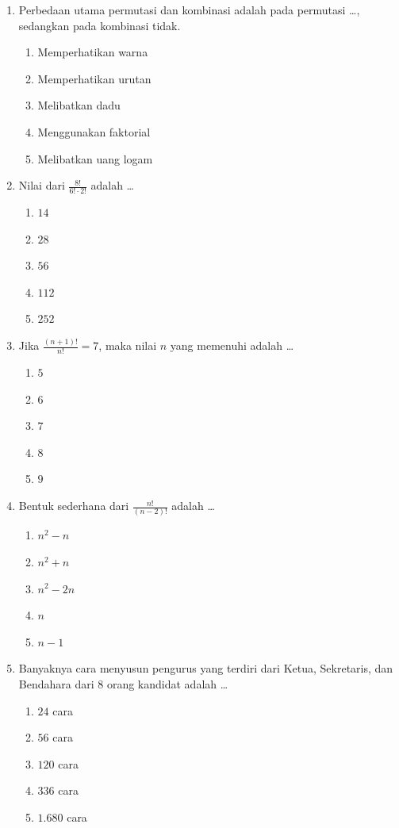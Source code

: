 \documentclass[12pt,a4paper]{article}
\begin{document}
\begin{enumerate}[leftmargin=*]
\item Perbedaan utama permutasi dan kombinasi adalah pada permutasi \dots, sedangkan pada kombinasi tidak.
    \begin{enumerate}[label=\alph*.]
        \item Memperhatikan warna
        \item Memperhatikan urutan
        \item Melibatkan dadu
        \item Menggunakan faktorial
        \item Melibatkan uang logam
    \end{enumerate}

\item Nilai dari $\frac{8!}{6! \cdot 2!}$ adalah \dots
    \begin{enumerate}[label=\alph*.]
        \item $14$
        \item $28$
        \item $56$
        \item $112$
        \item $252$
    \end{enumerate}

\item Jika $\frac{(n+1)!}{n!} = 7$, maka nilai $n$ yang memenuhi adalah \dots
    \begin{enumerate}[label=\alph*.]
        \item $5$
        \item $6$
        \item $7$
        \item $8$
        \item $9$
    \end{enumerate}

\item Bentuk sederhana dari $\frac{n!}{(n-2)!}$ adalah \dots
    \begin{enumerate}[label=\alph*.]
        \item $n^2 - n$
        \item $n^2 + n$
        \item $n^2 - 2n$
        \item $n$
        \item $n - 1$
    \end{enumerate}

\item Banyaknya cara menyusun pengurus yang terdiri dari Ketua, Sekretaris, dan Bendahara dari 8 orang kandidat adalah \dots
    \begin{enumerate}[label=\alph*.]
        \item $24$ cara
        \item $56$ cara
        \item $120$ cara
        \item $336$ cara
        \item $1.680$ cara
    \end{enumerate}


\end{enumerate}
\end{document}
